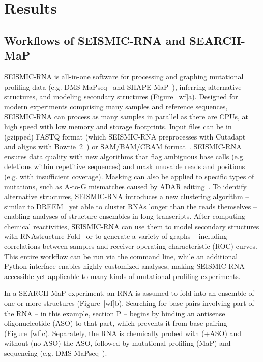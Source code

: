 \documentclass[main.tex]{subfiles}
\begin{document}
\section{Results}

\subsection{Workflows of SEISMIC-RNA and SEARCH-MaP}


SEISMIC-RNA is all-in-one software for processing and graphing mutational profiling data (e.g. DMS-MaPseq~\cite{Zubradt2016} and SHAPE-MaP~\cite{Siegfried2014}), inferring alternative structures, and modeling secondary structures (Figure~\ref{wf}a).
Designed for modern experiments comprising many samples and reference sequences, SEISMIC-RNA can process as many samples in parallel as there are CPUs, at high speed with low memory and storage footprints.
Input files can be in (gzipped) FASTQ format (which SEISMIC-RNA preprocesses with Cutadapt~\cite{Martin2011} and aligns with Bowtie~2~\cite{Langmead2012}) or SAM/BAM/CRAM format~\cite{Li2009}.
SEISMIC-RNA ensures data quality with new algorithms that flag ambiguous base calls (e.g. deletions within repetitive sequences) and mask unusable reads and positions (e.g. with insufficient coverage).
Masking can also be applied to specific types of mutations, such as A-to-G mismatches caused by ADAR editing~\cite{Roth2019}.
To identify alternative structures, SEISMIC-RNA introduces a new clustering algorithm -- similar to DREEM~\cite{Tomezsko2020} yet able to cluster RNAs longer than the reads themselves -- enabling analyses of structure ensembles in long transcripts.
After computing chemical reactivities, SEISMIC-RNA can use them to model secondary structures with RNAstructure Fold~\cite{Reuter2010,Cordero2012} or to generate a variety of graphs -- including correlations between samples and receiver operating characteristic (ROC) curves.
This entire workflow can be run via the command line, while an additional Python interface enables highly customized analyses, making SEISMIC-RNA accessible yet applicable to many kinds of mutational profiling experiments.

In a SEARCH-MaP experiment, an RNA is assumed to fold into an ensemble of one or more structures (Figure~\ref{wf}b).
Searching for base pairs involving part of the RNA -- in this example, section P -- begins by binding an antisense oligonucleotide (ASO) to that part, which prevents it from base pairing (Figure~\ref{wf}c).
Separately, the RNA is chemically probed with (+ASO) and without (no-ASO) the ASO, followed by mutational profiling (MaP) and sequencing (e.g. DMS-MaPseq~\cite{Zubradt2016}).
\end{document}
